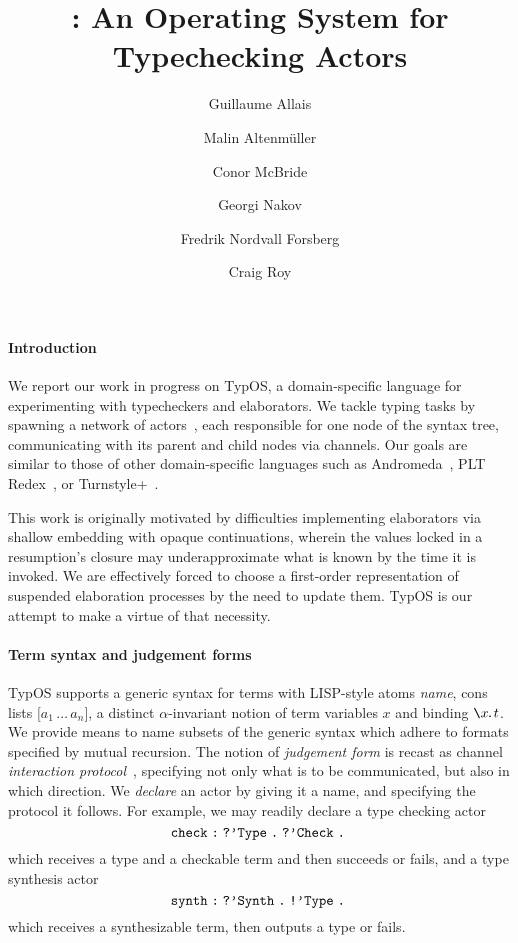 \documentclass{easychair}
\author{
  Guillaume Allais\inst{1}
  \and
  Malin Altenm\"uller\inst{2}
  \and
  Conor McBride\inst{2}
  \and
  Georgi Nakov\inst{2}
  \and
  Fredrik Nordvall Forsberg\inst{2}
  \and
  Craig Roy\inst{3}
}
\institute{
University of St Andrews,
Fife, United Kingdom
\and
University of Strathclyde,
Glasgow, United Kingdom
\and
Quantinuum \& Cambridge Quantum,
Cambridge, United Kingdom
}
\title{\TypOS: An Operating System for Typechecking Actors}
\newcommand{\TypOS}{TypOS\xspace}
\newcommand{\lsq}{\texttt{[}}
\newcommand{\rsq}{\texttt{]}}
\newcommand{\atom}[1]{\texttt{\symbol{39}}#1\;}
\newcommand{\bsl}{\texttt{\symbol{92}}}
\newcommand{\bind}[1]{\bsl #1\!\texttt{.}}
\newcommand{\listof}[1]{\lsq #1 \rsq}
\newcommand{\hab}{\;\texttt{:}\;}
\newcommand{\bang}{\texttt{!}}
\newcommand{\query}{\texttt{?}}
\newcommand{\then}{\texttt{.}\;}
\begin{document}
\maketitle


\paragraph{Introduction}
We report our work in progress on \TypOS{}, a domain-specific language
for experimenting with typecheckers and elaborators. %
We tackle typing tasks by spawning a network of
actors~\cite{hewitt1973actors}, each responsible for one node of the
syntax tree, communicating with its parent and child
nodes via channels. Our goals are similar to those of other
domain-specific languages such as Andromeda~\cite{andromeda}, PLT
Redex~\cite{redex}, or Turnstyle+~\cite{turnstyleplus}.

This work is originally motivated by difficulties implementing
elaborators via shallow embedding with opaque continuations, wherein
the values locked in a resumption's closure may
underapproximate what is known by the time it is invoked.
We are effectively forced to choose a first-order representation of
suspended elaboration processes by the need to update them. \TypOS{}
is our attempt to make a virtue of that necessity.

\paragraph{Term syntax and judgement forms}
\TypOS{} supports a generic syntax for terms with LISP-style atoms
\atom{\textit{name}}\!, cons lists $\listof{a_1\, \ldots\, a_n}$, a
distinct $\alpha$-invariant notion of term variables $x$ and binding
$\bind x t$. We provide means to name subsets of the generic syntax
which adhere to formats specified by mutual recursion.  The notion of
\emph{judgement form} is recast as channel \emph{interaction
  protocol}~\cite{honda1993session}, specifying not only what is to be
communicated, but also in which direction.  We \emph{declare} an actor
by giving it a name, and specifying the protocol it follows. For
example, we may readily declare a type checking actor
\[
  \mathtt{check \hab \query\atom{Type}\then \query\atom{Check}\then}
\]
which receives a type and a checkable term and then succeeds or fails,
and a type synthesis actor
\[
  \mathtt{synth \hab \query\atom{Synth}\then \bang\atom{Type}\then}
\]
which receives a synthesizable term, then outputs a type or fails.
\end{document}
